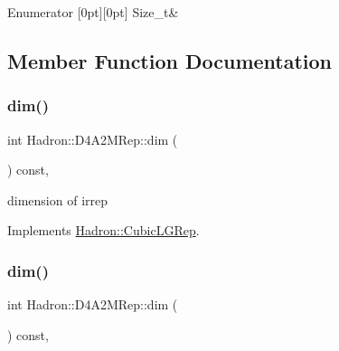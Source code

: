 \begin{DoxyEnumFields}{Enumerator}
[0pt][0pt]{}\mbox{\label{structHadron_1_1D4A2MRep_a8cf735f061784b4cd170ddfff63ab809a5a7f1ff8353b081fd10503c2bdc27b5a}} 
Size\+\_\+t&\\
\hline

\end{DoxyEnumFields}


\subsection{Member Function Documentation}
\mbox{\label{structHadron_1_1D4A2MRep_a9f511013d556bb6632884f49e20d5c7e}} 
\subsubsection{\texorpdfstring{dim()}{dim()}\hspace{0.1cm}{\footnotesize\ttfamily [1/3]}}
{\footnotesize\ttfamily int Hadron\+::\+D4\+A2\+M\+Rep\+::dim (\begin{DoxyParamCaption}{ }\end{DoxyParamCaption}) const\hspace{0.3cm}{\ttfamily [inline]}, {\ttfamily [virtual]}}

dimension of irrep 

Implements \mbox{\hyperlink{structHadron_1_1CubicLGRep_a3acbaea26503ed64f20df693a48e4cdd}{Hadron\+::\+Cubic\+L\+G\+Rep}}.

\mbox{\label{structHadron_1_1D4A2MRep_a9f511013d556bb6632884f49e20d5c7e}} 
\subsubsection{\texorpdfstring{dim()}{dim()}\hspace{0.1cm}{\footnotesize\ttfamily [2/3]}}
{\footnotesize\ttfamily int Hadron\+::\+D4\+A2\+M\+Rep\+::dim (\begin{DoxyParamCaption}{ }\end{DoxyParamCaption}) const\hspace{0.3cm}{\ttfamily [inline]}, {\ttfamily [virtual]}}

